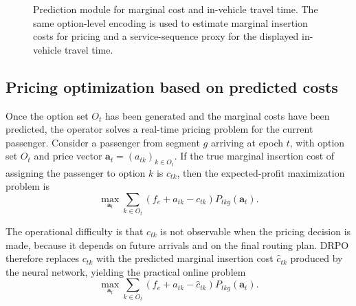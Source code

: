 \documentclass[preprint,12pt,authoryear]{elsarticle}
\begin{document}
\begin{figure}[t]
\centering
{}
\caption{Prediction module for marginal cost and in-vehicle travel time. The same option-level encoding is used to estimate marginal insertion costs for pricing and a service-sequence proxy for the displayed in-vehicle travel time.}
\label{fig:predictor}
\end{figure}

\subsection{Pricing optimization based on predicted costs}

Once the option set $O_t$ has been generated and the marginal costs have been predicted, the operator solves a real-time pricing problem for the current passenger. Consider a passenger from segment $g$ arriving at epoch $t$, with option set $O_t$ and price vector $\mathbf{a}_t=(a_{tk})_{k\in O_t}$. If the true marginal insertion cost of assigning the passenger to option $k$ is $c_{tk}$, then the expected-profit maximization problem is
\begin{equation}
\max_{\mathbf{a}_t} \sum_{k\in O_t} \left(f_e+a_{tk}-c_{tk}\right) P_{tkg}(\mathbf{a}_t).
\tag{14}\label{eq:pricing-true}
\end{equation}

The operational difficulty is that $c_{tk}$ is not observable when the pricing decision is made, because it depends on future arrivals and on the final routing plan. DRPO therefore replaces $c_{tk}$ with the predicted marginal insertion cost $\hat{c}_{tk}$ produced by the neural network, yielding the practical online problem
\begin{equation}
\max_{\mathbf{a}_t} \sum_{k\in O_t} \left(f_e+a_{tk}-\hat{c}_{tk}\right) P_{tkg}(\mathbf{a}_t).
\tag{15}\label{eq:pricing-pred}
\end{equation}
\end{document}
